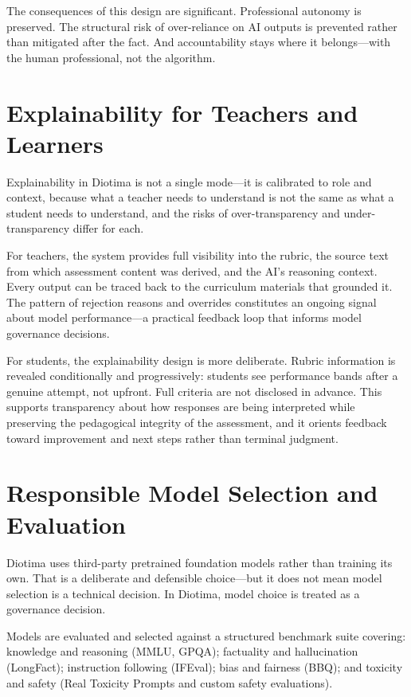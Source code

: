 \documentclass[10pt, a4paper, twocolumn]{article}
\begin{document}
The consequences of this design are significant. Professional autonomy is preserved.
The structural risk of over-reliance on AI outputs is prevented rather than mitigated
after the fact. And accountability stays where it belongs---with the human professional,
not the algorithm.

\section{Explainability for Teachers and Learners}

Explainability in Diotima is not a single mode---it is calibrated to role and context,
because what a teacher needs to understand is not the same as what a student needs to
understand, and the risks of over-transparency and under-transparency differ for each.

For teachers, the system provides full visibility into the rubric, the source text from
which assessment content was derived, and the AI's reasoning context. Every output can
be traced back to the curriculum materials that grounded it. The pattern of rejection
reasons and overrides constitutes an ongoing signal about model performance---a
practical feedback loop that informs model governance decisions.

For students, the explainability design is more deliberate. Rubric information is
revealed conditionally and progressively: students see performance bands after a
genuine attempt, not upfront. Full criteria are not disclosed in advance. This supports
transparency about how responses are being interpreted while preserving the pedagogical
integrity of the assessment, and it orients feedback toward improvement and next steps
rather than terminal judgment.

\section{Responsible Model Selection and Evaluation}

Diotima uses third-party pretrained foundation models rather than training its own.
That is a deliberate and defensible choice---but it does not mean model selection is
a technical decision. In Diotima, model choice is treated as a governance decision.

Models are evaluated and selected against a structured benchmark suite covering:
knowledge and reasoning (MMLU, GPQA); factuality and hallucination (LongFact);
instruction following (IFEval); bias and fairness (BBQ); and toxicity and safety
(Real Toxicity Prompts and custom safety evaluations).
\end{document}
